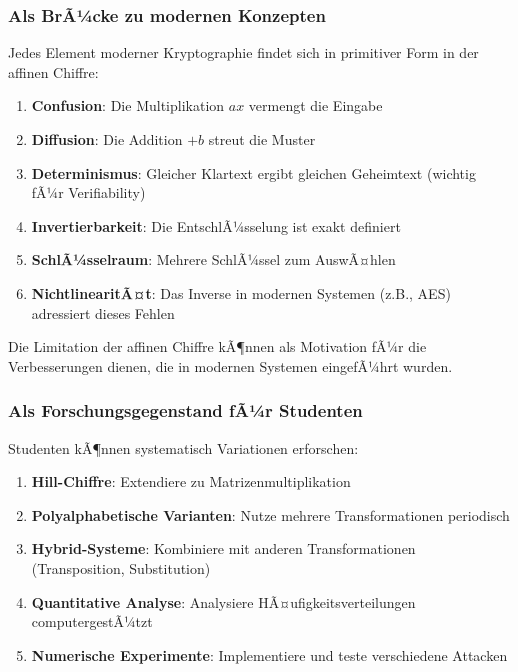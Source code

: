﻿\documentclass[12pt,a4paper]{article}
\begin{document}
	\subsubsection{Als BrÃ¼cke zu modernen Konzepten}
	
	Jedes Element moderner Kryptographie findet sich in primitiver Form in der affinen Chiffre:
	
	\begin{enumerate}
		\item \textbf{Confusion}: Die Multiplikation $ax$ vermengt die Eingabe
		\item \textbf{Diffusion}: Die Addition $+b$ streut die Muster
		\item \textbf{Determinismus}: Gleicher Klartext ergibt gleichen Geheimtext (wichtig fÃ¼r Verifiability)
		\item \textbf{Invertierbarkeit}: Die EntschlÃ¼sselung ist exakt definiert
		\item \textbf{SchlÃ¼sselraum}: Mehrere SchlÃ¼ssel zum AuswÃ¤hlen
		\item \textbf{NichtlinearitÃ¤t}: Das Inverse in modernen Systemen (z.B., AES) adressiert dieses Fehlen
	\end{enumerate}
	
	Die Limitation der affinen Chiffre kÃ¶nnen als Motivation fÃ¼r die Verbesserungen dienen, die in modernen Systemen eingefÃ¼hrt wurden.
	
	\subsubsection{Als Forschungsgegenstand fÃ¼r Studenten}
	
	Studenten kÃ¶nnen systematisch Variationen erforschen:
	
	\begin{enumerate}
		\item \textbf{Hill-Chiffre}: Extendiere zu Matrizenmultiplikation
		\item \textbf{Polyalphabetische Varianten}: Nutze mehrere Transformationen periodisch
		\item \textbf{Hybrid-Systeme}: Kombiniere mit anderen Transformationen (Transposition, Substitution)
		\item \textbf{Quantitative Analyse}: Analysiere HÃ¤ufigkeitsverteilungen computergestÃ¼tzt
		\item \textbf{Numerische Experimente}: Implementiere und teste verschiedene Attacken
	\end{enumerate}
	
\end{document}
